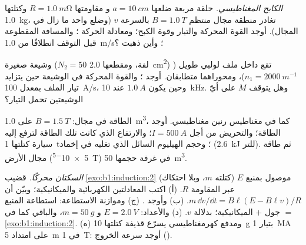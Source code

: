 \begin{exercise}[$\star\star$]\label{exo:b1:induction:7}
\emph{الكابح المغناطيسي.} حلقة مربعة ضلعها $a = \qty{10}{cm}$ و
مقاومتها $R = \qty{1.0}{m\ohm}$ وكتلتها \qty{1.0}{kg}، تغادر منطقة
مجال منتظم $B = \qty{1.0}{T}$ بالسرعة $v$ (وضلع واحد ما زال في
المجال). أوجد القوة المحركة والتيار وقوة الكبح؛ ومعادلة الحركة ؛ والمسافة المقطوعة قبل التوقف انطلاقًا من \qty{1.0}{m/s}؛ وأين
ذهبت ؟
\end{exercise}

\begin{exercise}[$\star\star$]\label{exo:b1:induction:8}
وشيعة صغيرة ($N_2 = 50$ لفة، ومقطعها \qty{2.0}{cm^2}) تقع داخل
ملف لولبي طويل ($n_1 = \qty{2000}{m^{-1}}$)، ومحوراهما متطابقان. أوجد ؛ والقوة المحركة في الوشيعة حين يتزايد تيار الملف بمعدل
\qty{100}{A/s}، وحين يكون $\qty{1.0}{A}$ عند \qty{10}{kHz}. وهل يتوقف $M$
على أيّ الوشيعتين تحمل التيار؟
\end{exercise}

\begin{exercise}[$\star\star$]\label{exo:b1:induction:9}
الطاقة في مجال: $B = \qty{1.5}{T}$ على \qty{1.0}{m^3}، كما في مغناطيس
رنين مغناطيسي. أوجد الطاقة؛ والتحريض من أجل $I = \qty{500}{A}$؛ والارتفاع الذي
كانت تلك الطاقة لترفع إليه سيارة كتلتها \qty{1}{t}؛ وحجم الهيليوم السائل الذي تغليه
في إخماد (\qty{2.6}{kJ} للتر). ثم طاقة مجال الأرض
(\qty{5e-5}{T}) في غرفة حجمها \qty{50}{m^3}.
\end{exercise}

\begin{exercise}[$\star\star\star$]\label{exo:b1:induction:10}
\emph{السكتان محركًا.} قضيب \cref{exo:b1:induction:2} (كتلته $m$،
وبلا احتكاك) موصول بمنبع $E$ عبر المقاومة $R$.
(أ) اكتب المعادلتين الكهربائية والميكانيكية؛ وبيّن أن $m\,\dd v/\dd t = B\ell(E -
B\ell v)/R$. (ب) وأوجد  . (ج) وموازنة الاستطاعة:
استطاعة المنبع $=$ جول $+$ الميكانيكية؛  بدلالة
$v$. (د) والأعداد: $E = \qty{2.0}{V}$ و $m = \qty{50}{g}$، والباقي كما في
\cref{exo:b1:induction:2}. (ه) ومدفع كهرمغناطيسي يسرّع قذيفة كتلتها \qty{10}{g}
بتيار \qty{1}{MA} على امتداد \qty{5}{m} في \qty{1}{T}: أوجد سرعة الخروج
().
\end{exercise}

